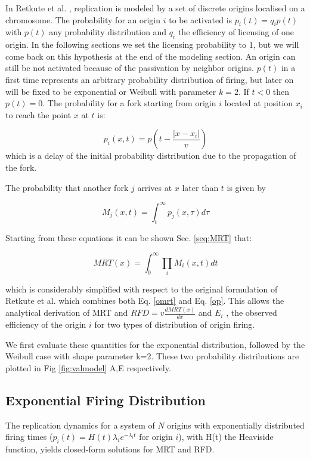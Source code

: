 \documentclass[10pt,a4paper]{revtex4-2}
\begin{document}
In Retkute et al. \cite{Retkute2012}, replication is modeled by a set of discrete origins localised on a chromosome. 
The probability for an origin $i$ to be activated is $p_i(t) =q_i p(t) $ with $p(t)$ any probability distribution and $q_i$ the efficiency of licensing of one origin. In the following sections we set the licensing probability to 1, but we will come back on this hypothesis at the end of the modeling section.  An origin can still be not activated because of the passivation by neighbor origins.
$p(t)$ in a first time represents an arbitrary probability distribution of firing, but later on will be fixed to be exponential or Weibull with parameter $k=2$. If $t<0$ then $p(t)=0$. The probability for a fork starting from origin $i$ located at position $x_i$ to reach the point $x$ at $t$ is:

\begin{equation}
p_i(x,t) =  p \left(t-\frac{|x-x_i|}{v}\right) 
\end{equation} 
which is a delay of the initial probability distribution due to the propagation of the fork. 

The probability that another fork $j$ arrives at $x$ later than $t$  is given by

\begin{equation}
M_j(x,t) = \int_t^{\infty} p_j(x,\tau) d\tau
\end{equation} 


Starting from these equations it can be shown Sec. \ref{seq:MRT} that:

\begin{equation}\label{mrt0s}
MRT(x) =  \int_{0}^{\infty} \prod_{i} M_i(x,t) dt
\end{equation}

which is considerably simplified with respect to the original formulation of Retkute et al. \cite{Retkute2012} which combines both 
Eq. \eqref{omrt} and Eq. \eqref{op}. This allows the analytical derivation of MRT and $RFD=v\frac{dMRT(x)}{dx}$ and $E_i$ , the observed efficiency of the origin $i$ for two types of distribution of origin firing.

We first evaluate these quantities for the exponential distribution, followed by the Weibull case with shape parameter k=2. These two probability distributions are plotted 
in Fig \ref{fig:valmodel} A,E respectively.





\subsection{Exponential Firing Distribution}
The replication dynamics for a system of \(N\) origins with exponentially distributed firing times (\(p_i(t) = H(t)\lambda_i e^{-\lambda_i t}\) for origin $i$), with H(t) the Heaviside function, yields closed-form solutions for MRT and RFD. 
\end{document}
